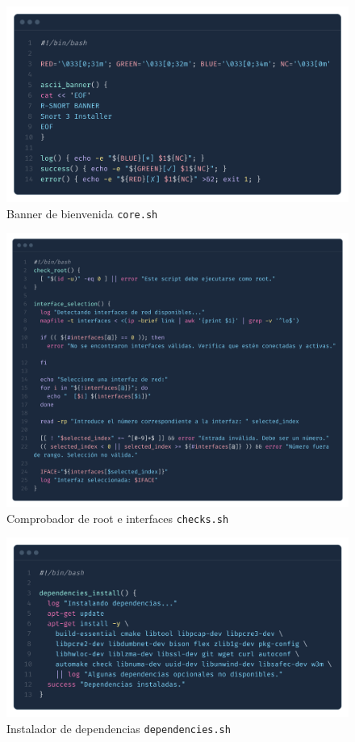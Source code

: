 \documentclass[12pt,a4paper]{report}
\begin{document}
\begin{figure}[H]
	\centering
	\includegraphics[scale=0.12]{script_automatico/2.png}
	\caption{Banner de bienvenida \texttt{core.sh}}
	\label{fig:core-sh}
\end{figure}

\begin{figure}[H]
	\centering
	\includegraphics[scale=0.12]{script_automatico/3.png}
	\caption{Comprobador de root e interfaces \texttt{checks.sh}}
	\label{fig:checks-sh}
\end{figure}

\begin{figure}[H]
	\centering
	\includegraphics[scale=0.12]{script_automatico/4.png}
	\caption{Instalador de dependencias \texttt{dependencies.sh}}
	\label{fig:dependencies-sh}
\end{figure}
\end{document}
